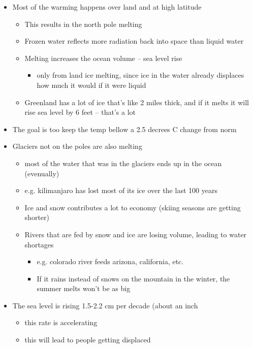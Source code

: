 \documentclass{article}
\theoremstyle{definition}
\begin{document}
\begin{itemize}
	\item Most of the warming happens over land and at high latitude
		\begin{itemize}
			\item This results in the north pole melting
			\item Frozen water reflects more radiation back into space than liquid water
			\item Melting increases the ocean volume  -- sea level rise
				\begin{itemize}
					\item only from land ice melting, since ice in the water already displaces how much it would if it were liquid
				\end{itemize}
			\item Greenland has a lot of ice that's like 2 miles thick, and if it melts it will rise sea level by 6 feet -- that's a lot
		\end{itemize}
	\item The goal is too keep the temp bellow a 2.5 decrees C change from norm
	\item Glaciers not on the poles are also melting
		\begin{itemize}
			\item most of the water that was in the glaciers ends up in the ocean (evenually)
			\item e.g. kilimanjaro has lost most of its ice over the last 100 years
			\item Ice and snow contributes a lot to economy (skiing seasons are getting shorter)
			\item Rivers that are fed by snow and ice are losing volume, leading to water shortages 
				\begin{itemize}
					\item e.g. colorado river feeds arizona, california, etc.
					\item If it rains instead of snows on the mountain in the winter, the summer melts won't be as big
				\end{itemize}
		\end{itemize}
	\item The sea level is rising 1.5-2.2 cm per decade (about an inch
		\begin{itemize}
			\item this rate is accelerating
			\item this will lead to people getting displaced
				\begin{itemize}

\end{itemize}
\end{itemize}
\end{itemize}
\end{document}
